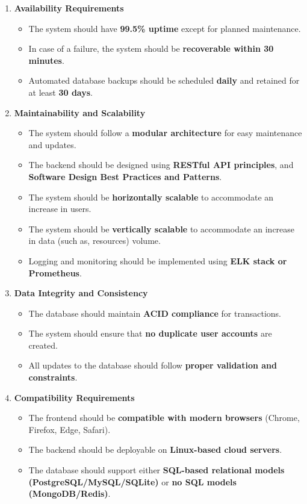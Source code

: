 \documentclass[11pt]{article}
\begin{document}
\begin{enumerate}
    \item \textbf{Availability Requirements}
    \begin{itemize}
        \item The system should have \textbf{99.5\% uptime} except for planned maintenance.
        \item In case of a failure, the system should be \textbf{recoverable within 30 minutes}.
        \item Automated database backups should be scheduled \textbf{daily} and retained for at least \textbf{30 days}.
    \end{itemize}

    \item \textbf{Maintainability and Scalability}
    \begin{itemize}
        \item The system should follow a \textbf{modular architecture} for easy maintenance and updates.
        \item The backend should be designed using \textbf{RESTful API principles}, and \textbf{Software Design Best Practices and Patterns}.
        \item The system should be \textbf{horizontally scalable} to accommodate an increase in users.
        \item The system should be \textbf{vertically scalable} to accommodate an increase in data (such as, resources) volume.
        \item Logging and monitoring should be implemented using \textbf{ELK stack or Prometheus}.
    \end{itemize}

    \item \textbf{Data Integrity and Consistency}
    \begin{itemize}
        \item The database should maintain \textbf{ACID compliance} for transactions.
        \item The system should ensure that \textbf{no duplicate user accounts} are created.
        \item All updates to the database should follow \textbf{proper validation and constraints}.
    \end{itemize}

    \item \textbf{Compatibility Requirements}
    \begin{itemize}
        \item The frontend should be \textbf{compatible with modern browsers} (Chrome, Firefox, Edge, Safari).
        \item The backend should be deployable on \textbf{Linux-based cloud servers}.
        \item The database should support either \textbf{SQL-based relational models (PostgreSQL/MySQL/SQLite)} or \textbf{no SQL models (MongoDB/Redis)}.
    \end{itemize}


\end{enumerate}
\end{document}
